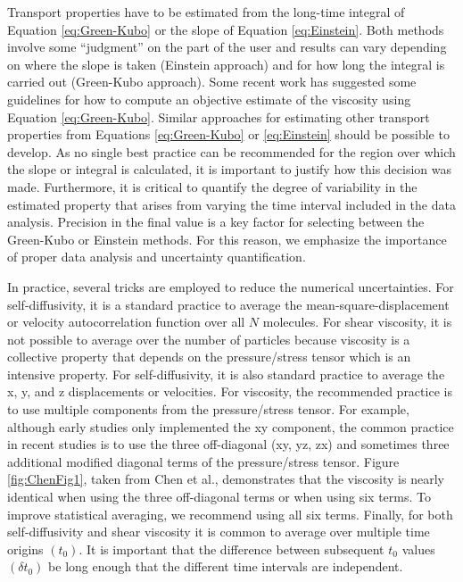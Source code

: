 \documentclass[9pt]{livecoms}
\begin{document}
Transport properties have to be estimated from the long-time integral of Equation \ref{eq:Green-Kubo} or the slope of Equation \ref{eq:Einstein}. Both methods involve some “judgment” on the part of the user and results can vary depending on where the slope is taken (Einstein approach) and for how long the integral is carried out (Green-Kubo approach). Some recent work has suggested some guidelines for how to compute an objective estimate of the viscosity using Equation \ref{eq:Green-Kubo}. Similar approaches for estimating other transport properties from Equations \ref{eq:Green-Kubo} or \ref{eq:Einstein} should be possible to develop. As no single best practice can be recommended for the region over which the slope or integral is calculated, it is important to justify how this decision was made. Furthermore, it is critical to quantify the degree of variability in the estimated property that arises from varying the time interval included in the data analysis. Precision in the final value is a key factor for selecting between the Green-Kubo or Einstein methods. For this reason, we emphasize the importance of proper data analysis and uncertainty quantification.

In practice, several tricks are employed to reduce the numerical uncertainties. For self-diffusivity, it is a standard practice to average the mean-square-displacement or velocity autocorrelation function over all $N$ molecules. For shear viscosity, it is not possible to average over the number of particles because viscosity is a collective property that depends on the pressure/stress tensor which is an intensive property. For self-diffusivity, it is also standard practice to average the x, y, and z displacements or velocities. For viscosity, the recommended practice is to use multiple components from the pressure/stress tensor. For example, although early studies only implemented the xy component, the common practice in recent studies is to use the three off-diagonal (xy, yz, zx) and sometimes three additional modified diagonal terms of the pressure/stress tensor. Figure \ref{fig:ChenFig1}, taken from Chen et al., demonstrates that the viscosity is nearly identical when using the three off-diagonal terms or when using six terms. To improve statistical averaging, we recommend using all six terms. Finally, for both self-diffusivity and shear viscosity it is common to average over multiple time origins $(t_0)$. It is important that the difference between subsequent $t_0$ values $(\delta t_0)$ be long enough that the different time intervals are independent.  
\end{document}
